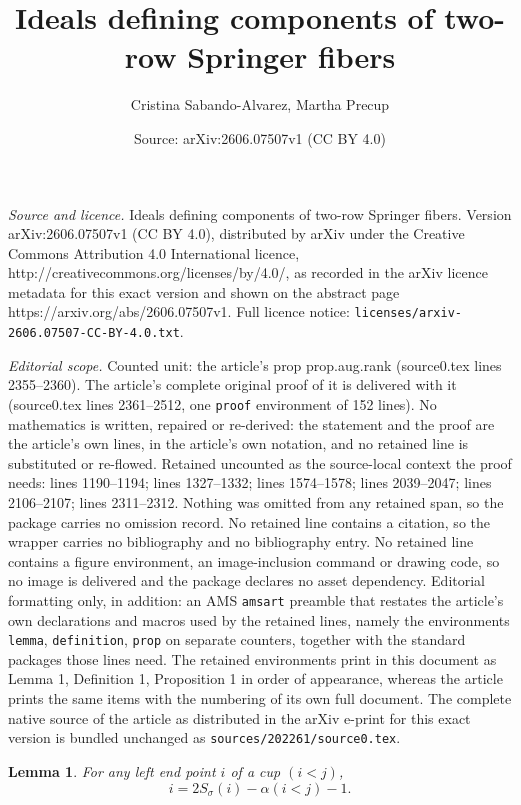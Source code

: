 \documentclass[10pt,a4paper]{amsart}
\title{Ideals defining components of two-row Springer fibers}
\author{Cristina Sabando-Alvarez, Martha Precup}
\date{Source: arXiv:2606.07507v1 (CC BY 4.0)}
\newtheorem{lemma}{Lemma}
\newcommand{\ga}{\alpha}
\newcommand{\gs}{\sigma}
\begin{document}
\maketitle

\noindent\emph{Source and licence.} Ideals defining components of two-row Springer fibers. Version arXiv:2606.07507v1 (CC BY 4.0), distributed by arXiv under the Creative Commons Attribution 4.0 International licence, http://creativecommons.org/licenses/by/4.0/, as recorded in the arXiv licence metadata for this exact version and shown on the abstract page https://arxiv.org/abs/2606.07507v1. Full licence notice: \texttt{licenses/arxiv-2606.07507-CC-BY-4.0.txt}.\par\smallskip

\noindent\textit{Editorial scope.} Counted unit: the article's prop prop.aug.rank (source0.tex lines 2355--2360). The article's complete original proof of it is delivered with it (source0.tex lines 2361--2512, one \texttt{proof} environment of 152 lines). No mathematics is written, repaired or re-derived: the statement and the proof are the article's own lines, in the article's own notation, and no retained line is substituted or re-flowed.  Retained uncounted as the source-local context the proof needs: lines 1190--1194; lines 1327--1332; lines 1574--1578; lines 2039--2047; lines 2106--2107; lines 2311--2312.  Nothing was omitted from any retained span, so the package carries no omission record.  No retained line contains a citation, so the wrapper carries no bibliography and no bibliography entry.  No retained line contains a figure environment, an image-inclusion command or drawing code, so no image is delivered and the package declares no asset dependency.  Editorial formatting only, in addition: an AMS \texttt{amsart} preamble that restates the article's own declarations and macros used by the retained lines, namely the environments \texttt{lemma}, \texttt{definition}, \texttt{prop} on separate counters, together with the standard packages those lines need.  The retained environments print in this document as Lemma 1, Definition 1, Proposition 1 in order of appearance, whereas the article prints the same items with the numbering of its own full document.  The complete native source of the article as distributed in the arXiv e-print for this exact version is bundled unchanged as \texttt{sources/202261/source0.tex}.
\begin{lemma} \label{lem.leftend} For any left end point $i$ of a cup $(i<j)$,
\begin{equation}\label{rem:i}
    i=2S_\gs(i)-\ga(i<j)-1.
\end{equation}
\end{lemma}
\end{document}
